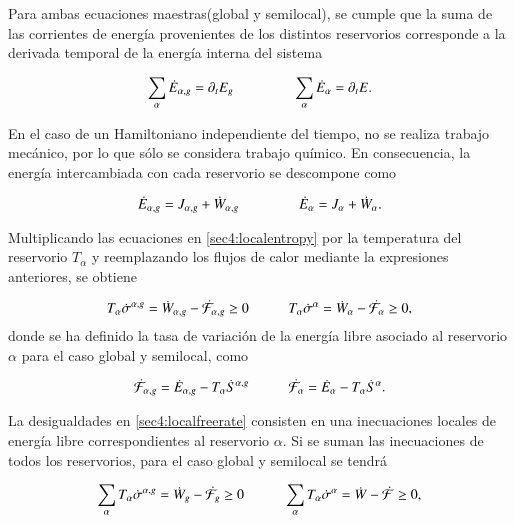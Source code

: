 Para ambas ecuaciones maestras(global y semilocal), se cumple que la suma de las corrientes de energía provenientes de los distintos reservorios corresponde a la derivada temporal de la energía interna del sistema

\begin{equation*}
    \sum_{\alpha}\dot{E}_{\alpha,g} = \partial_{t}E_{g} \hspace{15mm} \sum_{\alpha}\dot{E}_{\alpha} = \partial_{t}E.
\end{equation*}

En el caso de un Hamiltoniano independiente del tiempo, no se realiza trabajo mecánico, por lo que sólo se considera trabajo químico. En consecuencia, la energía intercambiada con cada reservorio se descompone como

\begin{equation*}
    \dot{E}_{\alpha,g} = J_{\alpha,g} + \dot{W}_{\alpha,g} \hspace{15mm} \dot{E}_{\alpha} = J_{\alpha} + \dot{W}_{\alpha}. 
\end{equation*}

Multiplicando las ecuaciones en \ref{sec4:localentropy} por la temperatura del reservorio $T_{\alpha}$ y reemplazando los flujos de calor mediante la expresiones anteriores, se obtiene

\begin{equation}
    T_{\alpha} \dot{\sigma}^{\alpha,g} = \dot{W}_{\alpha,g} - \dot{\mathcal{F}}_{\alpha,g} \geq 0 \hspace{10mm}  
    T_{\alpha} \dot{\sigma}^{\alpha} = \dot{W}_{\alpha} - \dot{\mathcal{F}}_{\alpha} \geq 0,              
\label{sec4:localfreerate}
\end{equation}
donde se ha definido la tasa de variación de la energía libre asociado al reservorio $\alpha$ para el caso global y semilocal, como

\begin{equation*}
    \dot{\mathcal{F}}_{\alpha,g} = \dot{E}_{\alpha,g} - T_{\alpha}\dot{S}^{\alpha,g} \hspace{10mm}
    \dot{\mathcal{F}}_{\alpha} = \dot{E}_{\alpha} - T_{\alpha}\dot{S}^{\alpha}.
\end{equation*}

La desigualdades en \ref{sec4:localfreerate} consisten en una inecuaciones locales de energía libre correspondientes al reservorio $\alpha$. Si se suman las inecuaciones de todos los reservorios, para el caso global y semilocal se tendrá 

\begin{equation}
    \sum_{\alpha}T_{\alpha} \dot{\sigma}^{\alpha,g} = \dot{W}_{g} - \dot{\mathcal{F}}_{g} \geq 0 \hspace{10mm}
    \sum_{\alpha}T_{\alpha} \dot{\sigma}^{\alpha} = \dot{W} - \dot{\mathcal{F}} \geq 0,
\label{sec4:freeratefinal}
\end{equation}

